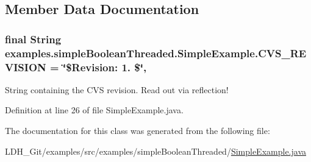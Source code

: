 \subsection{Member Data Documentation}
\hypertarget{classexamples_1_1simple_boolean_threaded_1_1_simple_example_a93ef8938c86ff16e7dddb13b7e861b86}{
\subsubsection[{C\-V\-S\-\_\-\-R\-E\-V\-I\-S\-I\-O\-N}]{\setlength{\rightskip}{0pt plus 5cm}final String examples.\-simple\-Boolean\-Threaded.\-Simple\-Example.\-C\-V\-S\-\_\-\-R\-E\-V\-I\-S\-I\-O\-N = \char`\"{}\$Revision\-: 1. \$\char`\"{}\hspace{0.3cm}{\ttfamily [static]}, {\ttfamily [private]}}}\label{classexamples_1_1simple_boolean_threaded_1_1_simple_example_a93ef8938c86ff16e7dddb13b7e861b86}
String containing the C\-V\-S revision. Read out via reflection! 

Definition at line 26 of file Simple\-Example.\-java.



The documentation for this class was generated from the following file\-:\begin{DoxyCompactItemize}
\item 
L\-D\-H\-\_\-\-Git/examples/src/examples/simple\-Boolean\-Threaded/\hyperlink{simple_boolean_threaded_2_simple_example_8java}{Simple\-Example.\-java}\end{DoxyCompactItemize}
